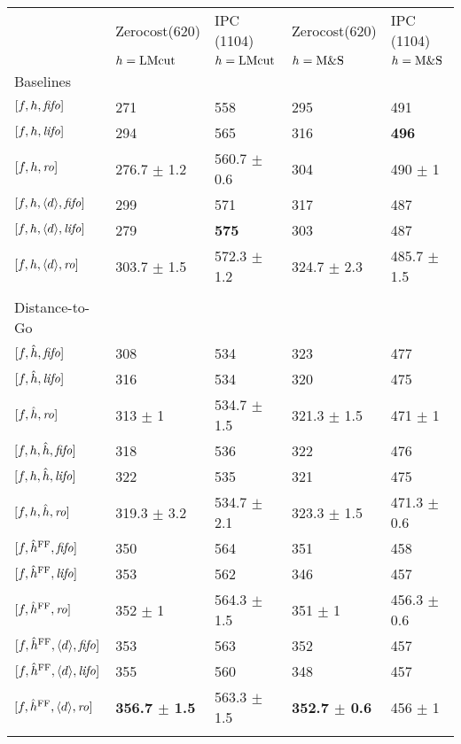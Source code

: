 \begin{center}
\begin{tabular}{|l|l|l|l|l|}
\hline
 & Zerocost(620) & IPC (1104) & Zerocost(620) & IPC (1104)\\
 & \(h=\text{LMcut}\) & \(h=\text{LMcut}\) & \(h=\text{M\&S}\) & \(h=\text{M\&S}\)\\
\hline
Baselines &  &  &  & \\
\([f,h,{\text{\textit{fifo}}}]\) & 271 & 558 & 295 & 491\\
\([f,h,{\text{\textit{lifo}}}]\) & 294 & 565 & 316 & \textbf{496}\\
\([f,h,{\text{\textit{ro}}}]\) & 276.7 \(\pm\) 1.2 & 560.7 \(\pm\) 0.6 & 304 & 490 \(\pm\) 1\\
\([f,h,{\left<d\right>},{\text{\textit{fifo}}}]\) & 299 & 571 & 317 & 487\\
\([f,h,{\left<d\right>},{\text{\textit{lifo}}}]\) & 279 & \textbf{575} & 303 & 487\\
\([f,h,{\left<d\right>},{\text{\textit{ro}}}]\) & 303.7 \(\pm\) 1.5 & 572.3 \(\pm\) 1.2 & 324.7 \(\pm\) 2.3 & 485.7 \(\pm\) 1.5\\
 &  &  &  & \\
Distance-to-Go &  &  &  & \\
\([f,\hat{h},{\text{\textit{fifo}}}]\) & 308 & 534 & 323 & 477\\
\([f,\hat{h},{\text{\textit{lifo}}}]\) & 316 & 534 & 320 & 475\\
\([f,\hat{h},{\text{\textit{ro}}}]\) & 313 \(\pm\) 1 & 534.7 \(\pm\) 1.5 & 321.3 \(\pm\) 1.5 & 471 \(\pm\) 1\\
\([f,h,\hat{h},{\text{\textit{fifo}}}]\) & 318 & 536 & 322 & 476\\
\([f,h,\hat{h},{\text{\textit{lifo}}}]\) & 322 & 535 & 321 & 475\\
\([f,h,\hat{h},{\text{\textit{ro}}}]\) & 319.3 \(\pm\) 3.2 & 534.7 \(\pm\) 2.1 & 323.3 \(\pm\) 1.5 & 471.3 \(\pm\) 0.6\\
\([f,\hat{h}^{\text{FF}},{\text{\textit{fifo}}}]\) & 350 & 564 & 351 & 458\\
\([f,\hat{h}^{\text{FF}},{\text{\textit{lifo}}}]\) & 353 & 562 & 346 & 457\\
\([f,\hat{h}^{\text{FF}},{\text{\textit{ro}}}]\) & 352 \(\pm\) 1 & 564.3 \(\pm\) 1.5 & 351 \(\pm\) 1 & 456.3 \(\pm\) 0.6\\
\([f,\hat{h}^{\text{FF}},{\left<d\right>},{\text{\textit{fifo}}}]\) & 353 & 563 & 352 & 457\\
\([f,\hat{h}^{\text{FF}},{\left<d\right>},{\text{\textit{lifo}}}]\) & 355 & 560 & 348 & 457\\
\([f,\hat{h}^{\text{FF}},{\left<d\right>},{\text{\textit{ro}}}]\) & \textbf{356.7 \(\pm\) 1.5} & 563.3 \(\pm\) 1.5 & \textbf{352.7 \(\pm\) 0.6} & 456 \(\pm\) 1\\
 &  &  &  & \\
\hline
\end{tabular}
\end{center}
